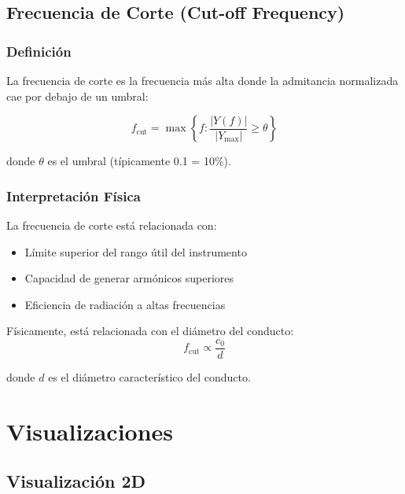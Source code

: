 \documentclass[12pt,a4paper,twocolumn]{article}
\newcommand{\admittance}{Y}
\newcommand{\freq}{f}
\begin{document}
\subsection{Frecuencia de Corte (Cut-off Frequency)}

\subsubsection{Definición}

La frecuencia de corte es la frecuencia más alta donde la admitancia normalizada cae por debajo de un umbral:

\begin{equation}
\freq_{\text{cut}} = \max\left\{f : \frac{|\admittance(f)|}{|\admittance_{\max}|} \geq \theta\right\}
\label{eq:cutoff_freq}
\end{equation}

donde $\theta$ es el umbral (típicamente 0.1 = 10\%).

\subsubsection{Interpretación Física}

La frecuencia de corte está relacionada con:

\begin{itemize}
    \item Límite superior del rango útil del instrumento
    \item Capacidad de generar armónicos superiores
    \item Eficiencia de radiación a altas frecuencias
\end{itemize}

Físicamente, está relacionada con el diámetro del conducto:
\begin{equation}
\freq_{\text{cut}} \propto \frac{c_0}{d}
\label{eq:cutoff_diametro}
\end{equation}

donde $d$ es el diámetro característico del conducto.

\section{Visualizaciones}

\subsection{Visualización 2D}
\end{document}
